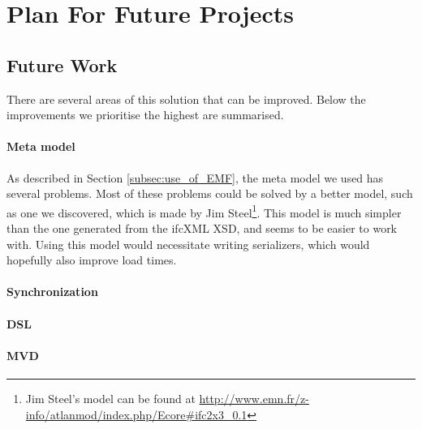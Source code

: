 \section{Plan For Future Projects}
\subsection{Future Work}
\label{sec:future_work}
There are several areas of this solution that can be improved. Below the improvements we prioritise the highest are summarised. 
\paragraph{Meta model}
As described in Section \ref{subsec:use_of_EMF}, the meta model we used has several problems. Most of these problems could be solved by a better model, such as one we discovered, which is made by Jim Steel\footnote{Jim Steel's model can be found at \url{http://www.emn.fr/z-info/atlanmod/index.php/Ecore#ifc2x3_0.1}}. This model is much simpler than the one generated from the ifcXML XSD, and seems to be easier to work with. Using this model would necessitate writing serializers, which would hopefully also improve load times.
\paragraph{Synchronization}
\paragraph{DSL}
\paragraph{MVD}
